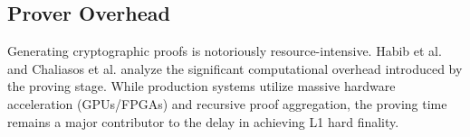 \subsection{Prover Overhead}
Generating cryptographic proofs is notoriously resource-intensive. Habib et al. \citet{habib2025bottlenecks} and Chaliasos et al. \citet{chaliasos2024benchmarking, chaliasos2024analyzing} analyze the significant computational overhead introduced by the proving stage. While production systems utilize massive hardware acceleration (GPUs/FPGAs) and recursive proof aggregation, the proving time remains a major contributor to the delay in achieving L1 hard finality.